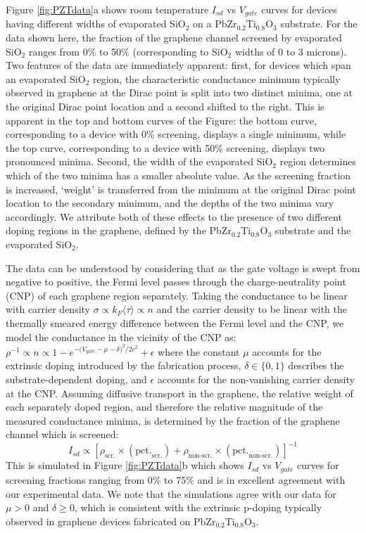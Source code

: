 \documentclass[edeposit,fullpage,draftthesis]{uiucthesis2009}
\begin{document}
        Figure \ref{fig:PZTdata}a shows room temperature $I_{sd}$ vs $V_{gate}$ curves for devices having different widths of evaporated SiO$_2$ on a PbZr$_{0.2}$Ti$_{0.8}$O$_3$ substrate. For the data shown here, the fraction of the graphene channel screened by evaporated SiO$_2$ ranges from 0\% to 50\% (corresponding to SiO$_2$ widths of 0 to 3 microns). Two features of the data are immediately apparent: first, for devices which span an evaporated SiO$_2$ region, the characteristic conductance minimum typically observed in graphene at the Dirac point is split into two distinct minima, one at the original Dirac point location and a second shifted to the right. This is apparent in the top and bottom curves of the Figure: the bottom curve, corresponding to a device with 0\% screening, displays a single minimum, while the top curve, corresponding to a device with 50\% screening, displays two pronounced minima. Second, the width of the evaporated SiO$_2$ region determines which of the two minima has a smaller absolute value. As the screening fraction is increased, `weight' is transferred from the minimum at the original Dirac point location to the secondary minimum, and the depths of the two minima vary accordingly. We attribute both of these effects to the presence of two different doping regions in the graphene, defined by the PbZr$_{0.2}$Ti$_{0.8}$O$_3$ substrate and the evaporated SiO$_2$.

        The data can be understood by considering that as the gate voltage is swept from negative to positive, the Fermi level passes through the charge-neutrality point (CNP) of each graphene region separately. Taking the conductance to be linear with carrier density\cite{Hwang2007} $\sigma \propto k_F \langle\tau\rangle \propto n$ and the carrier density to be linear with the thermally smeared energy difference between the Fermi level and the CNP\cite{CastroNeto2009}, we model the conductance in the vicinity of the CNP as: $\rho^{-1} \propto n \propto 1 - e^{{-(V_{gate}}-\mu-\delta)^2/2c^2} + \epsilon$ where the constant $\mu$ accounts for the extrinsic doping introduced by the fabrication process, $\delta \in \{0,1\}$ describes the substrate-dependent doping, and $\epsilon$ accounts for the non-vanishing carrier density at the CNP. Assuming diffusive transport in the graphene, the relative weight of each separately doped region, and therefore the relative magnitude of the measured conductance minima, is determined by the fraction of the graphene channel which is screened:
        \begin{equation}
            I_{sd} \propto \left[ \rho_\text{scr.} \times (\text{pct.}_\text{scr.}) + \rho_\text{non-scr.} \times (\text{pct.}_\text{non-scr.}) \right]^{-1}
        \end{equation}
        This is simulated in Figure \ref{fig:PZTdata}b which shows $I_{sd}$ vs $V_{gate}$ curves for screening fractions ranging from 0\% to 75\% and is in excellent agreement with our experimental data. We note that the simulations agree with our data for $\mu > 0$ and $\delta \geq 0$, which is consistent with the extrinsic p-doping typically observed in graphene devices fabricated on PbZr$_{0.2}$Ti$_{0.8}$O$_3$\cite{Baeumer2013}.
\end{document}
